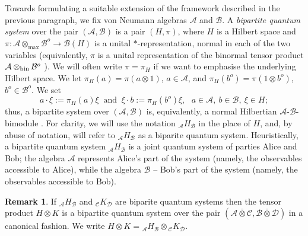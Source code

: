 \documentclass[11pt]{amsart}
\theoremstyle{definition}
\newtheorem{remark}[theorem]{Remark}
\newcommand{\cl}[1]{\mathcal{#1}}
\newcommand{\ten}{\otimes}
\begin{document}
Towards formulating a suitable extension 
of the framework described in the previous paragraph,
we fix von Neumann algebras $\cl{A}$ and $\cl{B}$. 
A \textit{bipartite quantum system} over the pair $(\cl{A},\cl{B})$ 
is a pair $(H,\pi)$, where 
$H$ is a Hilbert space and 
$\pi : \cl{A}\ten_{\max} \cl{B}^{o}\to \cl B(H)$ is 
a unital $*$-representation, normal in each of the two variables (equivalently, $\pi$ is a unital representation of the binormal tensor product $\cl{A}\ten_{\rm bin} \cl{B}^o$ \cite{EL}).
We will often write $\pi=\pi_H$ if we want to emphasise the 
underlying Hilbert space.
We let $\pi_H(a) = \pi(a\ten 1)$, $a\in \cl{A}$, and 
$\pi_H(b^o) = \pi(1\otimes b^o)$, $b^o\in \cl{B}^o$.  
We set
$$a\cdot\xi := \pi_{H}(a)\xi \ \mbox{ and }
\ 
\xi\cdot b := \pi_{H}(b^o)\xi, \ \ \ a\in \cl{A}, \ b\in \cl{B}, \ \xi\in H;$$
thus, a bipartite system over $(\cl{A},\cl{B})$ is, equivalently, 
a normal Hilbertian $\cl{A}$-$\cl{B}$-bimodule \cite[\S IX.3]{takesaki2}. 
For clarity, we will use the notation $_\cl{A}H_\cl{B}$ in the place of $H$, 
and, by abuse of notation, 
will refer to $_\cl{A}H_\cl{B}$ as a biparite quantum system.
Heuristically, a bipartite quantum system $_\cl{A}H_\cl{B}$ is 
a joint quantum system of parties
Alice and Bob; the algebra $\cl{A}$ represents Alice's part of the system 
(namely, the observables accessible to Alice), while 
the algebra $\cl{B}$ -- Bob's part of the system 
(namely, the observables accessible to Bob).


\begin{remark}\label{r_intten}
If $_\cl{A}H_\cl{B}$ and $_\cl{C}K_\cl{D}$ are biparite quantum systems then 
the tensor product $H\otimes K$ is a bipartite quantum system 
over the pair $(\cl{A}\bar\otimes \cl{C}, \cl{B}\bar\otimes \cl{D})$ in a canonical fashion. 
We write $H\otimes K = \mbox{}_\cl{A}H_\cl{B} \otimes \mbox{}_\cl{C}K_\cl{D}$. 
\end{remark}
\end{document}
